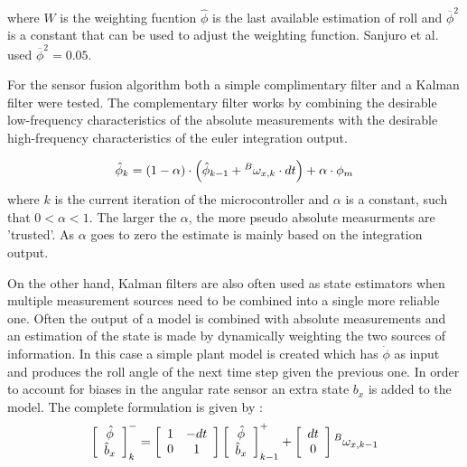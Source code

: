 where \ensuremath{W } is the weighting fucntion  \ensuremath{\hat{\phi}} is the last available estimation of roll and \ensuremath{\overline{\phi}^2} is a constant that can be used to adjust the weighting function. Sanjuro et al. used  \ensuremath{\overline{\phi}^2=0.05}.

For the sensor fusion algorithm both a simple complimentary filter and a Kalman filter were tested. The complementary filter works by combining the desirable low-frequency characteristics of the absolute measurements with the desirable high-frequency characteristics of the euler integration output. 

\begin{equation}
    \hat{\phi}_{k}=(1-\alpha) \cdot\left(\hat{\phi}_{k-1}+\prescript{B}{}{\omega_{x,k}} \cdot dt\right)+\alpha \cdot {\phi}_{m}
\end{equation}
where \ensuremath{k} is the current iteration of the microcontroller and \ensuremath{\alpha} is a constant, such that \ensuremath{0<\alpha<1}. The larger the \ensuremath{\alpha}, the more pseudo absolute measurments are 'trusted'. As \ensuremath{\alpha} goes to zero the estimate is mainly based on the integration output. 

On the other hand, Kalman filters are also often used as state estimators when multiple measurement sources need to be combined into a single more reliable one. Often the output of a model is combined with absolute measurements and an estimation of the state is made by dynamically weighting the two sources of information. In this case a simple plant model is created which has \ensuremath{\dot{\phi}} as input and  produces the roll angle of the next time step given the previous one. In order to account for biases in the angular rate sensor an extra state \ensuremath{b_x} is added to the model. The complete formulation is given by :
\begin{equation}
\left[ \begin{array}{c}{\hat{\phi}} \\ {\hat{b}_{x}}\end{array}\right]_{k}^{-}=\left[ \begin{array}{cc}{1} & {-d t} \\ {0} & {1}\end{array}\right] \left[ \begin{array}{c}{\hat{\phi}} \\ {\hat{b}_{x}}\end{array}\right]_{k-1}^{+}+\left[ \begin{array}{c}{d t} \\ {0}\end{array}\right] \prescript{B}{}{\omega_{x,k-1}}
\end{equation}


